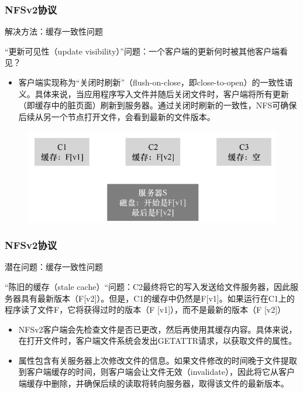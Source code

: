 \begin{frame}[fragile]
    \frametitle{NFSv2协议}
    解决方法：缓存一致性问题
    
    “更新可见性（update visibility）”问题：一个客户端的更新何时被其他客户端看见？
    \begin{itemize}
        \item 客户端实现称为“关闭时刷新”（flush-on-close，即close-to-open）的一致性语义。具体来说，当应用程序写入文件并随后关闭文件时，客户端将所有更新（即缓存中的脏页面）刷新到服务器。通过关闭时刷新的一致性，NFS可确保后续从另一个节点打开文件，会看到最新的文件版本。
    \end{itemize}
    
    \begin{figure}
        \includegraphics[width=0.5\linewidth]{figs/nfsv2-cache.png}
    \end{figure}
    
\end{frame}

\begin{frame}[fragile]
    \frametitle{NFSv2协议}
    潜在问题：缓存一致性问题
    
    “陈旧的缓存（stale cache）“问题：C2最终将它的写入发送给文件服务器，因此服务器具有最新版本（F[v2]）。但是，C1的缓存中仍然是F[v1]。如果运行在C1上的程序读了文件F，它将获得过时的版本（F [v1]），而不是最新的版本（F [v2]）\pause
    \begin{itemize}
        \item NFSv2客户端会先检查文件是否已更改，然后再使用其缓存内容。具体来说，在打开文件时，客户端文件系统会发出GETATTR请求，以获取文件的属性。
        \item 属性包含有关服务器上次修改文件的信息。如果文件修改的时间晚于文件提取到客户端缓存的时间，则客户端会让文件无效（invalidate），因此将它从客户端缓存中删除，并确保后续的读取将转向服务器，取得该文件的最新版本。
    \end{itemize}
    
    
\end{frame}


